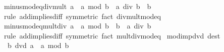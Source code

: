 \begin{isabellebody}
\endisatagproof
{\isafoldproof}%
%
\isadelimproof
\isanewline
%
\endisadelimproof
\isanewline
{}\isamarkupfalse%
\ minus{\isacharunderscore}{\kern0pt}mod{\isacharunderscore}{\kern0pt}eq{\isacharunderscore}{\kern0pt}div{\isacharunderscore}{\kern0pt}mult{\isacharcolon}{\kern0pt}\ {\isachardoublequoteopen}a\ {\isacharminus}{\kern0pt}\ a\ mod\ b\ {\isacharequal}{\kern0pt}\ a\ div\ b\ {\isacharasterisk}{\kern0pt}\ b{\isachardoublequoteclose}\isanewline
%
\isadelimproof
\ \ %
\endisadelimproof
%
\isatagproof
{}\isamarkupfalse%
\ {\isacharparenleft}{\kern0pt}rule\ add{\isacharunderscore}{\kern0pt}implies{\isacharunderscore}{\kern0pt}diff\ {\isacharbrackleft}{\kern0pt}symmetric{\isacharbrackright}{\kern0pt}{\isacharparenright}{\kern0pt}\ {\isacharparenleft}{\kern0pt}fact\ div{\isacharunderscore}{\kern0pt}mult{\isacharunderscore}{\kern0pt}mod{\isacharunderscore}{\kern0pt}eq{\isacharparenright}{\kern0pt}%
\endisatagproof
{\isafoldproof}%
%
\isadelimproof
\isanewline
%
\endisadelimproof
\isanewline
{}\isamarkupfalse%
\ minus{\isacharunderscore}{\kern0pt}mod{\isacharunderscore}{\kern0pt}eq{\isacharunderscore}{\kern0pt}mult{\isacharunderscore}{\kern0pt}div{\isacharcolon}{\kern0pt}\ {\isachardoublequoteopen}a\ {\isacharminus}{\kern0pt}\ a\ mod\ b\ {\isacharequal}{\kern0pt}\ b\ {\isacharasterisk}{\kern0pt}\ {\isacharparenleft}{\kern0pt}a\ div\ b{\isacharparenright}{\kern0pt}{\isachardoublequoteclose}\isanewline
%
\isadelimproof
\ \ %
\endisadelimproof
%
\isatagproof
{}\isamarkupfalse%
\ {\isacharparenleft}{\kern0pt}rule\ add{\isacharunderscore}{\kern0pt}implies{\isacharunderscore}{\kern0pt}diff\ {\isacharbrackleft}{\kern0pt}symmetric{\isacharbrackright}{\kern0pt}{\isacharparenright}{\kern0pt}\ {\isacharparenleft}{\kern0pt}fact\ mult{\isacharunderscore}{\kern0pt}div{\isacharunderscore}{\kern0pt}mod{\isacharunderscore}{\kern0pt}eq{\isacharparenright}{\kern0pt}%
\endisatagproof
{\isafoldproof}%
%
\isadelimproof
\isanewline
%
\endisadelimproof
\isanewline
{}\isamarkupfalse%
\ mod{\isacharunderscore}{\kern0pt}{}{\isacharunderscore}{\kern0pt}imp{\isacharunderscore}{\kern0pt}dvd\ {\isacharbrackleft}{\kern0pt}dest{\isacharbang}{\kern0pt}{\isacharbrackright}{\kern0pt}{\isacharcolon}{\kern0pt}\isanewline
\ \ {\isachardoublequoteopen}b\ dvd\ a{\isachardoublequoteclose}\ \ {\isachardoublequoteopen}a\ mod\ b\ {\isacharequal}{\kern0pt}\ {}{\isachardoublequoteclose}\isanewline
%
\isadelimproof
%
\endisadelimproof
%
\isatagproof
{}\isamarkupfalse%
\ {\isacharminus}{\kern0pt}\isanewline

\end{isabellebody}
